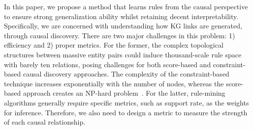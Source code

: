 In this paper, we propose a method that learns rules from the causal perspective to ensure strong generalization ability whilst retaining decent interpretability.
Specifically, we are concerned with understanding how KG links are generated, through causal discovery.
There are two major challenges in this problem: 1) efficiency and 2) proper metrics.
For the former, the complex topological structures between massive entity pairs could induce thousand-scale rule space with barely ten relations, posing challenges for both score-based and constraint-based causal discovery approaches.
The complexity of the constraint-based technique increases exponentially with the number of nodes, whereas the score-based approach creates an NP-hard problem~\cite{le2016fast}.
For the latter, rule-mining algorithms generally require specific metrics, such as support rate, as the weights for inference.
Therefore, we also need to design a metric to measure the strength of each causal relationship.

